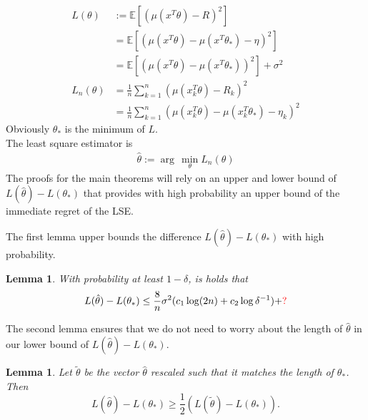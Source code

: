 \documentclass[twoside]{article} \usepackage{aistats2017}
\newcommand{\EV}[1] {
  \mathbb{E}\left[#1\right]}
\newtheorem{lemma}[theorem]{Lemma}
\begin{document}
\begin{align*}
    L(\theta) &:= \EV{(\mu(x^T\theta)-R)^2}\nonumber\\
    &= \EV{(\mu(x^T\theta)-\mu(x^T\theta_*)-\eta)^2}\\
    &=\EV{(\mu(x^T\theta)-\mu(x^T\theta_*))^2}+\sigma^2\\
    L_n(\theta) &= \frac{1}{n}\sum_{k=1}^n(\mu(x_k^T\theta)-R_k)^2\\
    &= \frac{1}{n}\sum_{k=1}^n(\mu(x_k^T\theta)-\mu(x_k^T\theta_*)-\eta_k)^2
\end{align*}
Obviously $\theta_*$ is the minimum of $L$.\\
The least square estimator is
\begin{align}
    \hat{\theta} := \arg\,\min_{\theta} L_n(\theta)
\end{align}
The proofs for the main theorems will rely on an upper and lower bound of $L(\hat{\theta})-L(\theta_*)$ that provides with high probability an upper bound of the immediate regret of the LSE.

The first lemma upper bounds the difference $L(\hat{\theta})-L(\theta_*)$ with high probability.
\begin{lemma}
    With probability at least $1-\delta$, is holds that 
    \begin{align}
    L(\hat{\theta})-L(\theta_*)\leq \frac{8}{n}\sigma^2(c_1\log(2n)+c_2\log{\delta^{-1}})+\color{red}?\color{black}
    \end{align}
\end{lemma}
The second lemma ensures that we do not need to worry about the length of $\hat{\theta}$ in our lower bound of $L(\hat{\theta})-L(\theta_*)$.
\begin{lemma}
    Let $\tilde{\theta}$ be the vector $\hat{\theta}$ rescaled such that it matches the length of $\theta_*$. Then
    $$L(\hat{\theta})-L(\theta_*) \geq \frac{1}{2}(L(\tilde{\theta})-L(\theta_*)).$$
\end{lemma}
\end{document}
